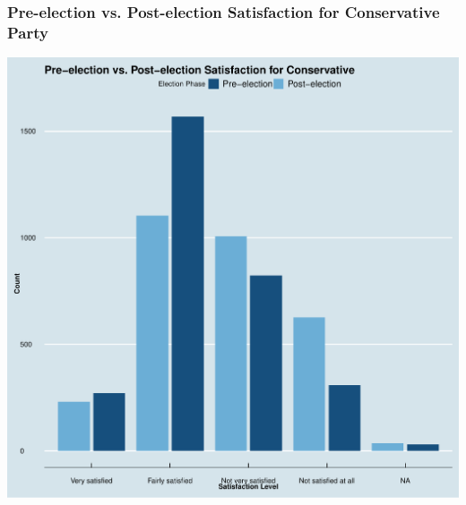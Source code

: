 \documentclass{beamer}
\begin{document}

\begin{frame}
    \frametitle{Pre-election vs. Post-election Satisfaction for Conservative Party}
    \begin{center}
        \includegraphics[scale=0.3]{Pre-election vs. Post-election Satisfaction for Conservative.pdf}
    \end{center}
\end{frame}




\end{document}

